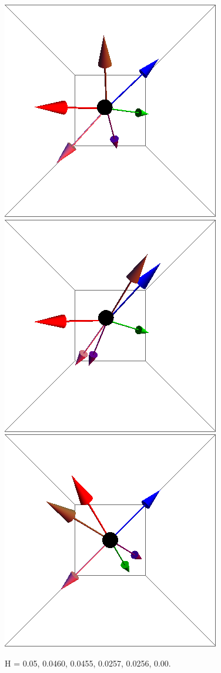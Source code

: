 \documentclass{article}
\begin{document}
\begin{figure}[ht]
\includegraphics[scale=0.3]{100/244S005to000R.png}
\includegraphics[scale=0.3]{100/245S005to000R.png}
\includegraphics[scale=0.3]{100/501S005to000R.png}
\caption{H = 0.05, 0.0460, 0.0455, 0.0257, 0.0256, 0.00.}
\end{figure}
\clearpage
\end{document}
